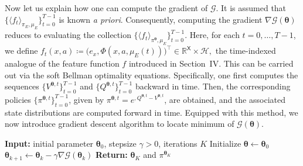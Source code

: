 \documentclass[11pt]{article}
\newcommand{\btheta}{{\boldsymbol \theta}}
\newcommand{\sX}{{\mathsf X}}
\newcommand{\cG}{{\mathcal G}}
\newcommand{\lk}[1]{\textcolor{black}{#1}} %
\begin{document}
Now let us explain how one can compute the gradient of $\cG$. It is assumed that $\{\langle f_t \rangle_{\pi_E,\mu_E}\}_{t=0}^{T-1}$ is known \textit{a priori}. Consequently, computing the gradient \( \nabla \mathcal{G}(\btheta) \) reduces to evaluating the collection \( \{\langle f_t \rangle_{\pi^{\boldsymbol{\theta}}, \mu_E}\}_{t=0}^{T-1} \). Here, for each $t = 0, \ldots, T - 1$, we define
\(
f_t(x, a) \coloneqq \bigl(e_x, \Phi(x, a, \mu_E(t))\bigr)^{\top}
\in \mathbb{R}^{\sX} \times \mathcal{H},
\)
the time-indexed analogue of the feature function $f$ introduced in Section~IV.
This can be carried out via the soft Bellman optimality equations. Specifically, one first computes the sequences \( \{V^{\boldsymbol{\theta},t}\}_{t=0}^{T-1} \) and \( \{Q^{\boldsymbol{\theta},t}\}_{t=0}^{T-1} \) backward in time. Then, the corresponding policies \( \{\pi^{\boldsymbol{\theta},t}\}_{t=0}^{T-1} \), given by \( \pi^{\boldsymbol{\theta},t} = e^{,Q^{\boldsymbol{\theta},t} - V^{\boldsymbol{\theta},t}} \), are obtained, and the associated state distributions are computed forward in time. Equipped with this method, we now introduce gradient descent algorithm to locate minimum of $\mathcal{G}(\btheta)$. 


\begin{algorithm}[H]
	\caption{\lk{Gradient Descent}}
	\label{GD2}
	\begin{algorithmic}[1]
\STATE \textbf{Input:} initial parameter $\btheta_0$, stepsize $\gamma > 0$, iterations $K$
\STATE Initialize $\btheta \leftarrow \btheta_0$
    \STATE $\btheta_{k+1} \leftarrow \btheta_k - \gamma \nabla \mathcal{G}(\btheta_k)$
\ENDFOR
\STATE \textbf{Return:} $\btheta_K$ and $\pi^{\btheta_K}$
\end{algorithmic}

\end{algorithm}
\end{document}
